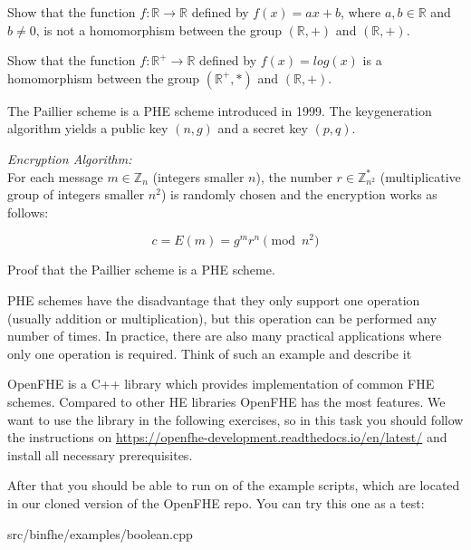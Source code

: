 \begin{aufgabe}
Show that the function $f: \mathbb{R} \rightarrow  \mathbb{R}$ defined by $f(x)=ax+b$, where $a,b \in \mathbb{R}$ and $b \neq 0$, is not a homomorphism between the group $(\mathbb{R},+)$ and  $(\mathbb{R},+)$.
\end{aufgabe}



\begin{aufgabe}
Show that the function $f: \mathbb{R^+} \rightarrow  \mathbb{R}$ defined by $f(x)=log(x)$ is a homomorphism between the group $(\mathbb{R^+},*)$ and  $(\mathbb{R},+)$.
\end{aufgabe}



\begin{aufgabe}
The Paillier scheme is a PHE scheme introduced in 1999. 
The keygeneration algorithm yields a public key $(n,g)$ and a secret key $(p,q)$.

\textit{Encryption Algorithm:}\\
For each message $m \in \mathbb{Z}_n$ (integers smaller $n$), the number $r \in \mathbb{Z}^*_{n^2}$ (multiplicative group of integers smaller $n^2$) is randomly chosen and the encryption works as follows:

\begin{equation*}
    c = E(m) = g^mr^n \pmod{n^2}
\end{equation*}

Proof that the Paillier scheme is a PHE scheme.

\end{aufgabe}



\begin{aufgabe}
PHE schemes have the disadvantage that they only support one operation (usually addition or multiplication), but this operation can be performed any number of times. In practice, there are also many practical applications where only one operation is required. Think of such an example and describe it
\end{aufgabe}



\begin{aufgabe}[OpenFHE]
OpenFHE is a C++ library which provides implementation of common FHE schemes.
Compared to other HE libraries OpenFHE has the most features.
We want to use the library in the following exercises, so in this task you should follow the instructions on \url{https://openfhe-development.readthedocs.io/en/latest/} and install all necessary prerequisites.

After that you should be able to run on of the example scripts, which are located in our cloned version of the OpenFHE repo.
You can try this one as a test:

src/binfhe/examples/boolean.cpp
\end{aufgabe}

